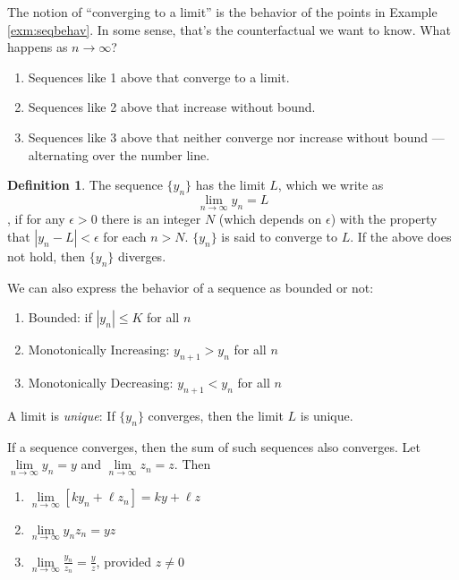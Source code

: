 \documentclass[
]{book}
\providecommand{\tightlist}{%
  \setlength{\itemsep}{0pt}\setlength{\parskip}{0pt}}
\theoremstyle{definition}
\newtheorem{definition}{Definition}[chapter]
\theoremstyle{definition}
\theoremstyle{definition}
\theoremstyle{remark}
\begin{document}
The notion of ``converging to a limit'' is the behavior of the points in Example \ref{exm:seqbehav}. In some sense, that's the counterfactual we want to know. What happens as \(n\rightarrow \infty\)?

\begin{enumerate}
\def\labelenumi{\arabic{enumi}.}
\tightlist
\item
  Sequences like 1 above that converge to a limit.
\item
  Sequences like 2 above that increase without bound.
\item
  Sequences like 3 above that neither converge nor increase without bound --- alternating over the number line.
\end{enumerate}

\begin{definition}
\protect\hypertarget{def:unnamed-chunk-2}{}{\label{def:unnamed-chunk-2} }The sequence \(\{y_n\}\) has the limit \(L\), which we write as \[\lim\limits_{n \to \infty} y_n =L\], if for any \(\epsilon>0\) there is an integer \(N\) (which depends on \(\epsilon\)) with the property that \(|y_n -L|<\epsilon\) for each \(n>N\). \(\{y_n\}\) is said to converge to \(L\). If the above does not hold, then \(\{y_n\}\) diverges.
\end{definition}

We can also express the behavior of a sequence as bounded or not:

\begin{enumerate}
\def\labelenumi{\arabic{enumi}.}
\tightlist
\item
  Bounded: if \(|y_n|\le K\) for all \(n\)
\item
  Monotonically Increasing: \(y_{n+1}>y_n\) for all \(n\)
\item
  Monotonically Decreasing: \(y_{n+1}<y_n\) for all \(n\)
\end{enumerate}

A limit is \emph{unique}: If \(\{y_n\}\) converges, then the limit \(L\) is unique.

If a sequence converges, then the sum of such sequences also converges. Let \(\lim\limits_{n \to \infty} y_n = y\) and \(\lim\limits_{n \to \infty} z_n =z\). Then

\begin{enumerate}
\def\labelenumi{\arabic{enumi}.}
\tightlist
\item
  \(\lim\limits_{n \to \infty} [k y_n + \ell z_n]= k y + \ell z\)
\item
  \(\lim\limits_{n \to \infty} y_n z_n = yz\)
\item
  \(\lim\limits_{n \to \infty} \frac{y_n}{z_n} = \frac{y}{z}\), provided \(z\neq 0\)
\end{enumerate}
\end{document}
